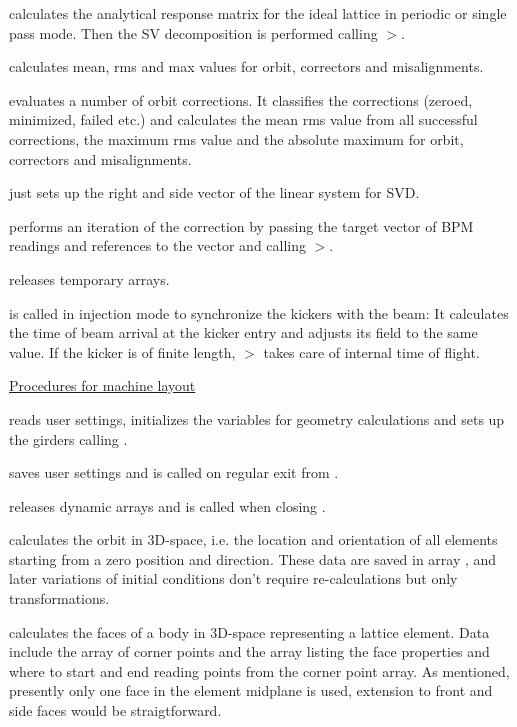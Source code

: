 \documentclass[12pt]{article}
\newcommand\code[1]{{\tt #1}}
\newcommand{\unico}[1]{{\color{burntorange}\code{#1}}}
\newcommand{\prcod}[2]{\opauni{#1}$>$\unico{#2}}
\newcommand{\opagui}[1]{\colorbox{blue!20}{{\color{black}\code{#1}}}}
\newcommand{\ogui}[1]{\hyperref[#1]{\opagui{#1}}}
\newcommand{\opauni}[1]{\colorbox{orange!30}{{\color{black}\code{#1}}}}
\newcommand{\todo}[1]{{\color{red} #1}}
\begin{document}
\unico{GetResponseMatrix} calculates the analytical response matrix for the ideal lattice in periodic or single pass mode. Then the SV decomposition is performed calling \prcod{mathlib}{SVDCMP}.

\unico{CodstatCalc} calculates mean, rms and max values for orbit, correctors and misalignments.

\unico{LoopstatCalc} evaluates a number of orbit corrections. It classifies the corrections (zeroed, minimized, failed etc.) and calculates the mean rms value from all successful corrections, the maximum rms value and the absolute maximum for orbit, correctors and misalignments.  

\unico{oco\_init} just sets up the right and side vector of the linear system for SVD.

\unico{oco\_step} performs an iteration of the correction by passing the target vector of BPM readings and references to the vector and calling \prcod{mathlib}{SVBKSB}.

\unico{oco\_term} releases temporary arrays.

\unico{SyncKickers} is called in injection mode to synchronize the kickers with the beam: It calculates the time of beam arrival at the kicker entry and adjusts its field \unico{delay} to the same value. If the kicker is of finite length, \prcod{elemlib}{Kicker} takes care of internal time of flight.

\underline{Procedures for machine layout}

\unico{GeoInit} reads user settings, initializes the variables for geometry calculations and sets up the girders calling \unico{GirderSetup}.

\unico{GeoExit} saves user settings and is called on regular exit from \ogui{opageometry}.

\unico{GeoClose} releases dynamic arrays and is called when closing \ogui{opageometry}.

\unico{CalcOrbit} calculates the orbit in 3D-space, i.e. the location and orientation of all elements starting from a zero position and direction. These data are saved in array \unico{midpt}, and later variations of initial conditions don't require re-calculations but only transformations. 
 
\unico{CalcFaces} calculates the faces of a body in 3D-space representing a lattice element. Data include the array \unico{vpt} of corner points and the array \unico{face} listing the face properties and where to start and end reading points from the corner point array. \todo{As mentioned, presently only one face in the element midplane is used, extension to front and side faces would be straigtforward.}
\end{document}
